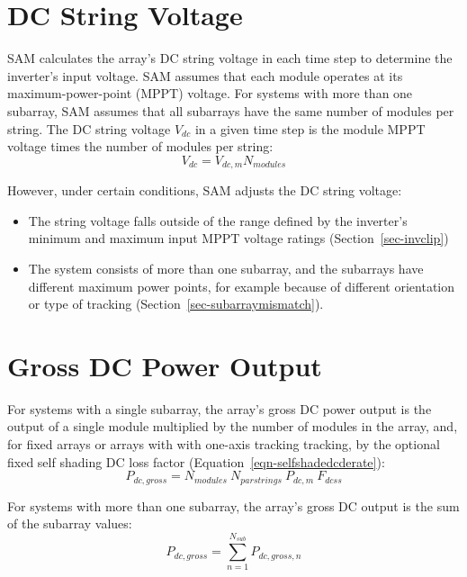 \documentclass[12pt,letterpaper]{article}
\begin{document}
\section{DC String Voltage}\label{sec-dcstringvoltage}

SAM calculates the array's DC string voltage in each time step to determine the inverter's input voltage. SAM assumes that each module operates at its maximum-power-point (MPPT) voltage. For systems with more than one subarray, SAM assumes that all subarrays have the same number of modules per string. The DC string voltage $V_{dc}$ in a given time step is the module MPPT voltage times the number of modules per string:
\begin{equation}
V_{dc} = V_{dc,m} N_{modules}
\end{equation}

However, under certain conditions, SAM adjusts the DC string voltage:

\begin{itemize}
\item The string voltage falls outside of the range defined by the inverter's minimum and maximum input MPPT voltage ratings (Section~\ref{sec-invclip})
\item The system consists of more than one subarray, and the subarrays have different maximum power points, for example because of different orientation or type of tracking (Section~\ref{sec-subarraymismatch}).
\end{itemize}

\section{Gross DC Power Output}

For systems with a single subarray, the array's gross DC power output is the output of a single module multiplied by the number of modules in the array, and, for fixed arrays or arrays with  with one-axis tracking tracking, by the optional fixed self shading DC loss factor (Equation~\ref{eqn-selfshadedcderate}):
\begin{equation}
P_{dc,gross} = N_{modules}~N_{parstrings}~P_{dc,m}~F_{dcss}
\end{equation}

For systems with more than one subarray, the array's gross DC output is the sum of the subarray values:
\begin{equation}
P_{dc,gross} = \sum_{n=1}^{N_{sub}} P_{dc,gross,n}
\end{equation}
\end{document}
